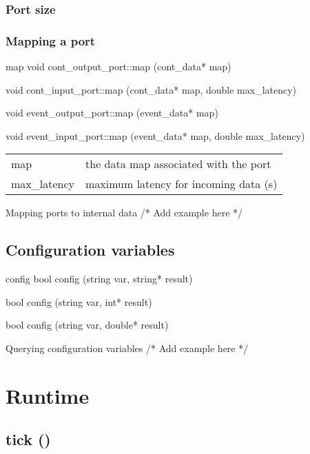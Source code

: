 \documentclass[a4paper]{report}
\begin{document}
\subsubsection{Port size}

\subsubsection{Mapping a port}

\begin{head}{map}
    void cont_output_port::map (cont_data* map)

    void cont_input_port::map (cont_data* map, double max_latency)

    void event_output_port::map (event_data* map)

    void event_input_port::map (event_data* map, double max_latency)
\end{head}
\begin{tabular}{ll}
  map         & the data map associated with the port \\
  max\_latency & maximum latency for incoming data (s)
  \\
\end{tabular}

\begin{code}{Mapping ports to internal data}
  /* Add example here */
\end{code}

\subsection{Configuration variables}

\begin{head}{config}
    bool config (string var, string* result)

    bool config (string var, int* result)

    bool config (string var, double* result)
\end{head}

\begin{code}{Querying configuration variables}
  /* Add example here */
\end{code}

\section{Runtime}

\subsection{tick ()}
\end{document}
